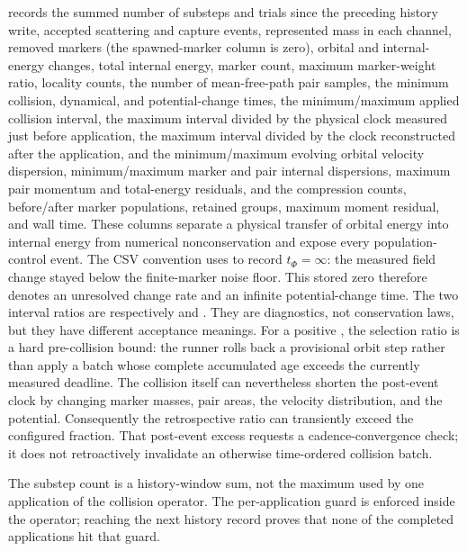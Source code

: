  records the summed number of substeps and trials
since the preceding history write,
accepted scattering and capture events, represented mass in each channel,
removed markers (the spawned-marker column is zero), orbital and internal-energy changes, total
internal energy, marker count, maximum marker-weight ratio, locality counts,
the number of mean-free-path pair samples, the minimum collision,
dynamical, and potential-change times, the minimum/maximum applied collision
interval, the maximum interval divided by the physical clock measured just
before application, the maximum interval divided by the clock reconstructed
after the application, and the
minimum/maximum evolving orbital velocity dispersion,
minimum/maximum marker and pair internal dispersions, maximum pair momentum
and total-energy residuals, and the compression counts, before/after marker
populations, retained groups, maximum moment residual, and wall time.  These
columns separate a physical transfer of orbital energy into internal energy
from numerical nonconservation and expose every population-control event.
The CSV convention uses  to record
\(t_\Phi=\infty\): the measured field change stayed below the finite-marker
noise floor.  This stored zero therefore denotes an unresolved change rate
and an infinite potential-change time.
The two interval ratios are respectively
 and
.  They are diagnostics,
not conservation laws, but they have different acceptance meanings.  For a
positive , the selection ratio is
a hard pre-collision bound: the runner rolls back a provisional orbit step
rather than apply a batch whose complete accumulated age exceeds the
currently measured deadline.  The collision itself can nevertheless shorten
the post-event clock by changing marker masses, pair areas, the velocity
distribution, and the potential.  Consequently the retrospective ratio can
transiently exceed the configured fraction.  That post-event excess requests
a cadence-convergence check; it does not retroactively invalidate an
otherwise time-ordered collision batch.

The substep count is a history-window sum, not the maximum used by one
application of the collision operator.  The per-application
 guard is enforced inside the
operator; reaching the next history record proves that none of the completed
applications hit that guard.


